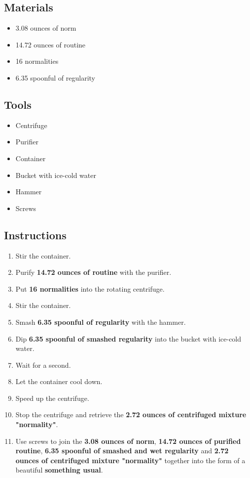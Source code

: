 \documentclass{article}
\begin{document}
\subsection{Materials}\begin{itemize}
\item 
3.08 ounces of norm
\item 
14.72 ounces of routine
\item 
16 normalities
\item 
6.35 spoonful of regularity
\end{itemize}
\subsection{Tools}\begin{itemize}
\item 
Centrifuge
\item 
Purifier
\item 
Container
\item 
Bucket with ice-cold water
\item 
Hammer
\item 
Screws
\end{itemize}
\subsection{Instructions}\begin{enumerate}
\item 
Stir the container.
\item 
Purify \textbf{14.72 ounces of routine} with the purifier.
\item 
Put \textbf{16 normalities} into the rotating centrifuge.
\item 
Stir the container.
\item 
Smash \textbf{6.35 spoonful of regularity} with the hammer.
\item 
Dip \textbf{6.35 spoonful of smashed regularity} into the bucket with ice-cold water.
\item 
Wait for a second.
\item 
Let the container cool down.
\item 
Speed up the centrifuge.
\item 
Stop the centrifuge and retrieve the \textbf{2.72 ounces of centrifuged mixture "normality"}.
\item 
Use screws to join the \textbf{3.08 ounces of norm}, \textbf{14.72 ounces of purified routine}, \textbf{6.35 spoonful of smashed and wet regularity} and \textbf{2.72 ounces of centrifuged mixture "normality"} together into the form of a beautiful \textbf{something usual}.
\end{enumerate}
\newpage
\end{document}
